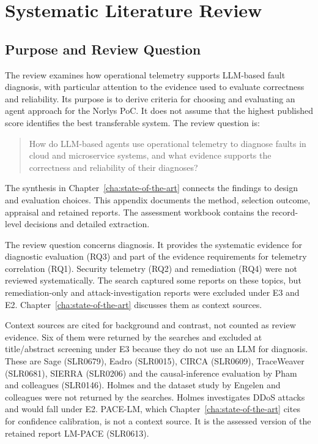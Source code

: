 \chapter{Systematic Literature Review}
\label{app:systematic-literature-review}

\section{Purpose and Review Question}

The review examines how operational telemetry supports LLM-based fault
diagnosis, with particular attention to the evidence used to evaluate
correctness and reliability. Its purpose is to derive criteria for choosing
and evaluating an agent approach for the Norlys PoC. It does not assume
that the highest published score identifies the best transferable system.
The review question is:

\begin{quote}
How do LLM-based agents use operational telemetry to diagnose faults in
cloud and microservice systems, and what evidence supports the correctness
and reliability of their diagnoses?
\end{quote}

The synthesis in Chapter~\ref{cha:state-of-the-art} connects the findings
to design and evaluation choices. This appendix documents the method,
selection outcome, appraisal and retained reports. The assessment workbook
contains the record-level decisions and detailed extraction.

The review question concerns diagnosis. It provides the systematic
evidence for diagnostic evaluation (RQ3) and part of the evidence
requirements for telemetry correlation (RQ1). Security telemetry (RQ2) and
remediation (RQ4) were not reviewed systematically. The search captured
some reports on these topics, but remediation-only and attack-investigation
reports were excluded under E3 and E2. Chapter~\ref{cha:state-of-the-art}
discusses them as context sources.

Context sources are cited for background and contrast, not counted as
review evidence. Six of them were returned by the searches and excluded
at title/abstract screening under E3 because they do not use an LLM for
diagnosis. These are Sage (SLR0679), Eadro (SLR0015), CIRCA (SLR0609),
TraceWeaver (SLR0681), SIERRA (SLR0206) and the causal-inference evaluation
by Pham and colleagues (SLR0146). Holmes and the dataset study by Engelen
and colleagues were not returned by the searches. Holmes investigates DDoS attacks
and would fall under E2. PACE-LM, which Chapter~\ref{cha:state-of-the-art}
cites for confidence calibration, is not a context source. It is the
assessed version of the retained report LM-PACE (SLR0613).

